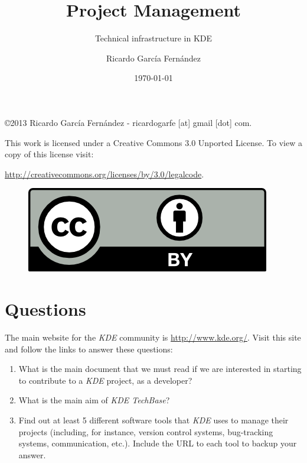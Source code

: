 \documentclass[11pt]{scrartcl}
\title{\textbf{Project Management}}
\subtitle{Technical infrastructure in KDE}
\author{Ricardo Garc\'ia Fern\'andez}
\date{\today}
\begin{document}
\maketitle

\vfill

\begin{flushright}
    \copyright  2013 Ricardo Garc\'ia Fern\'andez - ricardogarfe [at] gmail [dot] com.

    This work is licensed under a Creative Commons 3.0 Unported License.
    To view a copy of this license visit:
 
    \url{http://creativecommons.org/licenses/by/3.0/legalcode}.
\end{flushright}

\begin{figure}[h]
    \begin{flushright}	
        \includegraphics{by}
        \label{fig:by}
    \end{flushright}
\end{figure}

\newpage

\section{Questions}

The main website for the \emph{KDE} community is \url{http://www.kde.org/}. Visit this site and follow the links to answer these questions:

\begin{enumerate}
	\item What is the main document that we must read if we are interested in starting to contribute to a \emph{KDE} project, as a developer?
	\item What is the main aim of \emph{KDE TechBase}?
	\item Find out at least 5 different software tools that \emph{KDE} uses to manage their projects (including, for instance, version control systems, bug-tracking systems, communication, etc.). Include the URL to each tool to backup your answer.
\end{enumerate}
\end{document}
